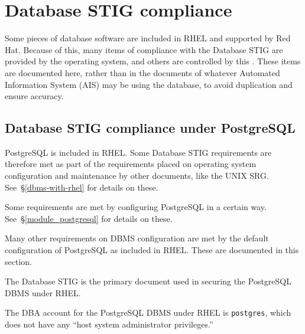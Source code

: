 \chapter{Database STIG compliance}
\label{DatabaseSTIGCompliance}

Some pieces of database software are included in RHEL and supported by Red
Hat. Because of this, many items of compliance with the Database STIG are
provided by the operating system, and others are controlled by this
\CMITSPolicy . These items are documented here, rather than in the
documents of whatever Automated Information System (AIS) may be using
the database, to avoid duplication and ensure accuracy.



\section{Database STIG compliance under PostgreSQL}
\label{DatabaseSTIGPostgreSQL}

PostgreSQL is included in RHEL. Some Database STIG requirements are
therefore met as part of the requirements placed on operating system
configuration and maintenance by other documents, like the UNIX SRG.
See~\S\ref{dbms-with-rhel} for details on these.

Some requirements are met by configuring PostgreSQL in a certain way.
See~\S\ref{module_postgresql} for details on these.

Many other requirements on DBMS configuration are met by the default
configuration of PostgreSQL as included in RHEL. These are documented in
this section.

\dinkus

%
The Database STIG is the primary document used in securing the PostgreSQL
DBMS under RHEL.

%
The DBA account for the PostgreSQL DBMS under RHEL is \verb!postgres!,
which does not have any ``host system administrator privileges.''

